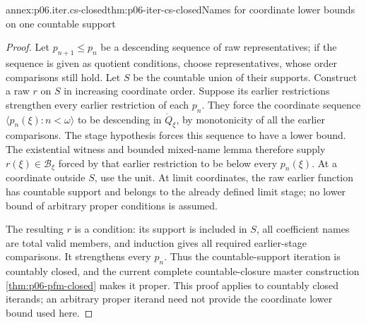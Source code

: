\begin{annexitem}{annex:p06.iter.cs-closed}{thm:p06-iter-cs-closed}{Names for coordinate lower bounds on one countable support}
\begin{proof}
Let \(p_{n+1}\leq p_n\) be a descending sequence of raw representatives;
if the sequence is given as quotient conditions, choose representatives,
whose order comparisons still hold. Let \(S\) be the countable union
of their supports. Construct a raw \(r\) on \(S\) in increasing
coordinate order. Suppose its earlier restrictions strengthen every
earlier restriction of each \(p_n\). They force the coordinate sequence
\(\langle p_n(\xi):n<\omega\rangle\) to be descending in
\(\dot Q_\xi\), by monotonicity of all the earlier comparisons.
The stage hypothesis forces this sequence to have a lower bound.
The existential witness and bounded mixed-name lemma therefore supply
\(r(\xi)\in\mathcal B_\xi\) forced by that earlier restriction to
be below every \(p_n(\xi)\). At a coordinate outside \(S\), use the
unit. At limit coordinates, the raw earlier function has countable
support and belongs to the already defined limit stage; no lower bound
of arbitrary proper conditions is assumed.

The resulting \(r\) is a condition: its support is included in \(S\),
all coefficient names are total valid members, and induction gives all
required earlier-stage comparisons. It strengthens every \(p_n\).
Thus the countable-support iteration is countably closed, and the
current complete countable-closure master construction
\cref{thm:p06-pfm-closed} makes it proper. This proof applies to
countably closed iterands; an arbitrary proper iterand need not provide
the coordinate lower bound used here.
\end{proof}
\end{annexitem}

